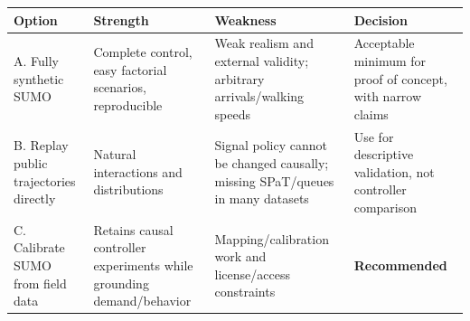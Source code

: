 \documentclass[
  english,
  11pt,
  a4paper,
]{article}
\newcounter{none} %
\begin{document}
{\def\LTcaptype{none} %
\begin{longtable}[]{@{}
  >{\raggedright\arraybackslash}p{}
  >{\raggedright\arraybackslash}p{}
  >{\raggedright\arraybackslash}p{}
  >{\raggedright\arraybackslash}p{}@{}}
\toprule\noalign{}
\begin{minipage}[b]{\linewidth}\raggedright
Option
\end{minipage} & \begin{minipage}[b]{\linewidth}\raggedright
Strength
\end{minipage} & \begin{minipage}[b]{\linewidth}\raggedright
Weakness
\end{minipage} & \begin{minipage}[b]{\linewidth}\raggedright
Decision
\end{minipage} \\
\midrule\noalign{}
\endhead
\bottomrule\noalign{}
\endlastfoot
A. Fully synthetic SUMO & Complete control, easy factorial scenarios,
reproducible & Weak realism and external validity; arbitrary
arrivals/walking speeds & Acceptable minimum for proof of concept, with
narrow claims \\
B. Replay public trajectories directly & Natural interactions and
distributions & Signal policy cannot be changed causally; missing
SPaT/queues in many datasets & Use for descriptive validation, not
controller comparison \\
C. Calibrate SUMO from field data & Retains causal controller
experiments while grounding demand/behavior & Mapping/calibration work
and license/access constraints & \textbf{Recommended} \\
\end{longtable}
}
\end{document}
